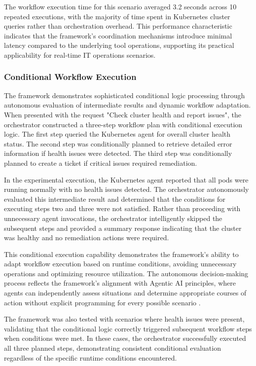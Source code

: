 \documentclass{article}
\begin{document}
The workflow execution time for this scenario averaged 3.2 seconds across 10 repeated executions, with the majority of time spent in Kubernetes cluster queries rather than orchestration overhead. This performance characteristic indicates that the framework's coordination mechanisms introduce minimal latency compared to the underlying tool operations, supporting its practical applicability for real-time IT operations scenarios.

\subsubsection{Conditional Workflow Execution}

The framework demonstrates sophisticated conditional logic processing through autonomous evaluation of intermediate results and dynamic workflow adaptation. When presented with the request "Check cluster health and report issues", the orchestrator constructed a three-step workflow plan with conditional execution logic. The first step queried the Kubernetes agent for overall cluster health status. The second step was conditionally planned to retrieve detailed error information if health issues were detected. The third step was conditionally planned to create a ticket if critical issues required remediation.

In the experimental execution, the Kubernetes agent reported that all pods were running normally with no health issues detected. The orchestrator autonomously evaluated this intermediate result and determined that the conditions for executing steps two and three were not satisfied. Rather than proceeding with unnecessary agent invocations, the orchestrator intelligently skipped the subsequent steps and provided a summary response indicating that the cluster was healthy and no remediation actions were required.

This conditional execution capability demonstrates the framework's ability to adapt workflow execution based on runtime conditions, avoiding unnecessary operations and optimizing resource utilization. The autonomous decision-making process reflects the framework's alignment with Agentic AI principles, where agents can independently assess situations and determine appropriate courses of action without explicit programming for every possible scenario \cite{acharya2025}.

The framework was also tested with scenarios where health issues were present, validating that the conditional logic correctly triggered subsequent workflow steps when conditions were met. In these cases, the orchestrator successfully executed all three planned steps, demonstrating consistent conditional evaluation regardless of the specific runtime conditions encountered.
\end{document}

